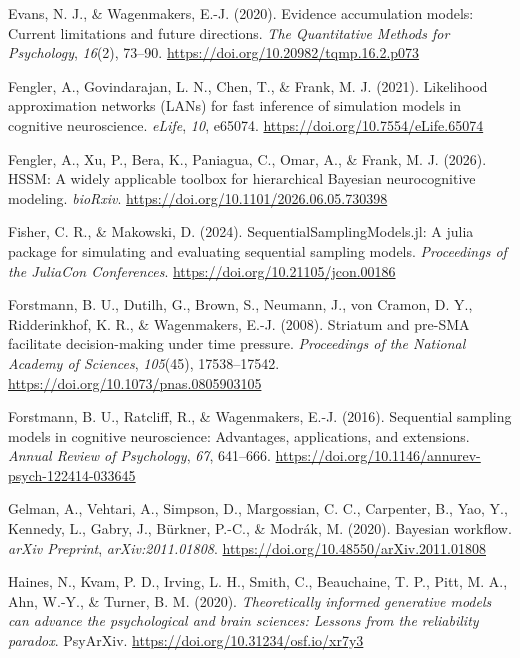 \documentclass[
  jou,
  floatsintext,
  longtable,
  nolmodern,
  notxfonts,
  notimes,
  12pt,
  colorlinks=true,linkcolor=blue,citecolor=blue,urlcolor=blue]{apa7}
\newlength{\cslhangindent}
\newenvironment{CSLReferences}[2] %
 {\begin{list}{}{%
  \setlength{\itemindent}{0pt}
  \setlength{\leftmargin}{0pt}
  \setlength{\parsep}{0pt}
  \ifodd #1
   \setlength{\leftmargin}{\cslhangindent}
   \setlength{\itemindent}{-1\cslhangindent}
  \fi
  \setlength{\itemsep}{#2\baselineskip}}}
 {\end{list}}
\begin{document}
\begin{CSLReferences}{1}{0}
Evans, N. J., \& Wagenmakers, E.-J. (2020). Evidence accumulation
models: Current limitations and future directions. \emph{The
Quantitative Methods for Psychology}, \emph{16}(2), 73--90.
\url{https://doi.org/10.20982/tqmp.16.2.p073}

Fengler, A., Govindarajan, L. N., Chen, T., \& Frank, M. J. (2021).
Likelihood approximation networks ({LANs}) for fast inference of
simulation models in cognitive neuroscience. \emph{eLife}, \emph{10},
e65074. \url{https://doi.org/10.7554/eLife.65074}

Fengler, A., Xu, P., Bera, K., Paniagua, C., Omar, A., \& Frank, M. J.
(2026). {HSSM}: A widely applicable toolbox for hierarchical {Bayesian}
neurocognitive modeling. \emph{bioRxiv}.
\url{https://doi.org/10.1101/2026.06.05.730398}

Fisher, C. R., \& Makowski, D. (2024). {SequentialSamplingModels.jl}: A
julia package for simulating and evaluating sequential sampling models.
\emph{Proceedings of the JuliaCon Conferences}.
\url{https://doi.org/10.21105/jcon.00186}

Forstmann, B. U., Dutilh, G., Brown, S., Neumann, J., von Cramon, D. Y.,
Ridderinkhof, K. R., \& Wagenmakers, E.-J. (2008). Striatum and
pre-{SMA} facilitate decision-making under time pressure.
\emph{Proceedings of the National Academy of Sciences}, \emph{105}(45),
17538--17542. \url{https://doi.org/10.1073/pnas.0805903105}

Forstmann, B. U., Ratcliff, R., \& Wagenmakers, E.-J. (2016). Sequential
sampling models in cognitive neuroscience: Advantages, applications, and
extensions. \emph{Annual Review of Psychology}, \emph{67}, 641--666.
\url{https://doi.org/10.1146/annurev-psych-122414-033645}

Gelman, A., Vehtari, A., Simpson, D., Margossian, C. C., Carpenter, B.,
Yao, Y., Kennedy, L., Gabry, J., Bürkner, P.-C., \& Modrák, M. (2020).
Bayesian workflow. \emph{arXiv Preprint}, \emph{arXiv:2011.01808}.
\url{https://doi.org/10.48550/arXiv.2011.01808}

Haines, N., Kvam, P. D., Irving, L. H., Smith, C., Beauchaine, T. P.,
Pitt, M. A., Ahn, W.-Y., \& Turner, B. M. (2020). \emph{Theoretically
informed generative models can advance the psychological and brain
sciences: Lessons from the reliability paradox}. PsyArXiv.
\url{https://doi.org/10.31234/osf.io/xr7y3}


\end{CSLReferences}
\end{document}
